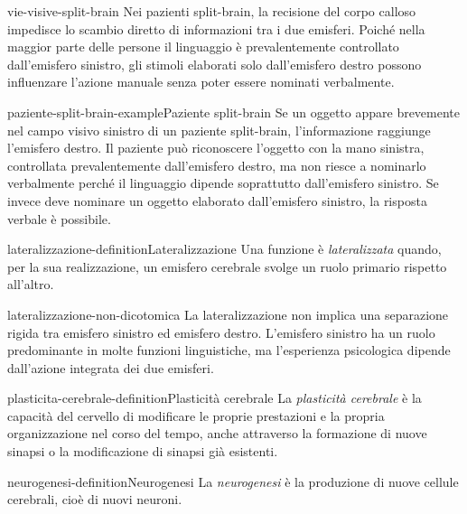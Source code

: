 \documentclass[preview]{standalone}
\begin{document}
\begin{snippet}{vie-visive-split-brain}
    Nei pazienti split-brain, la recisione del corpo calloso impedisce lo
    scambio diretto di informazioni tra i due emisferi. Poiché nella maggior
    parte delle persone il linguaggio è prevalentemente controllato
    dall'emisfero sinistro, gli stimoli elaborati solo dall'emisfero destro
    possono influenzare l'azione manuale senza poter essere nominati
    verbalmente.
\end{snippet}


\begin{snippetexample}{paziente-split-brain-example}{Paziente split-brain}
    Se un oggetto appare brevemente nel campo visivo sinistro di un paziente
    split-brain, l'informazione raggiunge l'emisfero destro. Il paziente può
    riconoscere l'oggetto con la mano sinistra, controllata prevalentemente
    dall'emisfero destro, ma non riesce a nominarlo verbalmente perché il
    linguaggio dipende soprattutto dall'emisfero sinistro. Se invece deve
    nominare un oggetto elaborato dall'emisfero sinistro, la risposta verbale è
    possibile.
\end{snippetexample}

\begin{snippetdefinition}{lateralizzazione-definition}{Lateralizzazione}
    Una funzione è \emph{lateralizzata} quando, per la sua realizzazione, un
    emisfero cerebrale svolge un ruolo primario rispetto all'altro.
\end{snippetdefinition}

\begin{snippet}{lateralizzazione-non-dicotomica}
    La lateralizzazione non implica una separazione rigida tra emisfero sinistro
    ed emisfero destro. L'emisfero sinistro ha un ruolo predominante in molte
    funzioni linguistiche, ma l'esperienza psicologica dipende dall'azione
    integrata dei due emisferi.
\end{snippet}

\begin{snippetdefinition}{plasticita-cerebrale-definition}{Plasticità cerebrale}
    La \emph{plasticità cerebrale} è la capacità del cervello di modificare le
    proprie prestazioni e la propria organizzazione nel corso del tempo, anche
    attraverso la formazione di nuove sinapsi o la modificazione di sinapsi già
    esistenti.
\end{snippetdefinition}

\begin{snippetdefinition}{neurogenesi-definition}{Neurogenesi}
    La \emph{neurogenesi} è la produzione di nuove cellule cerebrali, cioè di
    nuovi neuroni.
\end{snippetdefinition}
\end{document}
